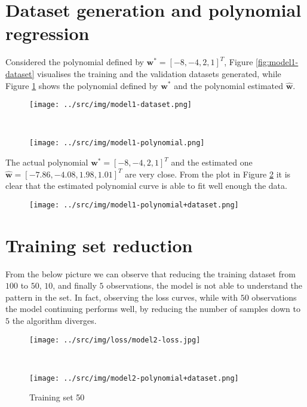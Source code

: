 \documentclass[a4paper,12pt]{article} %
\begin{document}
	\section{Dataset generation and polynomial regression} 
	Considered the polynomial defined by $\textbf{w}^*=[-8,-4,2,1]^T$, Figure 
	\ref{fig:model1-dataset} visualises the training and the validation 
	datasets generated, while Figure \ref{fig:model1-polynomial} shows 
	the polynomial defined by $\textbf{w}^*$ and the polynomial estimated 
	$\hat{\textbf{w}}$.
	
	\begin{figure}[H]
		\begin{minipage}[c]{.5\textwidth}
			\centering
			\texttt{[image: ../src/img/model1-dataset.png]}
			\label{fig:model1-dataset}
		\end{minipage}
		~
		\begin{minipage}[c]{.5\textwidth}
			\centering
			\texttt{[image: ../src/img/model1-polynomial.png]}
			\label{fig:model1-polynomial}
		\end{minipage}
	\end{figure}
	
 	The actual polynomial $\textbf{w}^*=[-8,-4,2,1]^T$ and the estimated one 	
 	$\hat{\textbf{w}}=[-7.86,-4.08,1.98,1.01]^T$ are very close.
 	From the plot in Figure \ref{fig:model1-polynomial+dataset} it is clear 
 	that the estimated polynomial curve is able to fit well enough the data.
 	
	\begin{figure}[H]
		\centering
		\texttt{[image: ../src/img/model1-polynomial+dataset.png]}
		\label{fig:model1-polynomial+dataset}
	\end{figure}
	
	\section{Training set reduction}
	From the below picture we can observe that reducing the training dataset 
	from $100$ to $50$, $10$, and finally $5$ observations, the model is not 
	able to understand the pattern in the set. In fact, observing the loss 
	curves, while with $50$ observations the model continuing performs well, by 
	reducing the number of samples down to $5$ the algorithm diverges.
	
	\begin{figure}[H]
		\begin{minipage}[t]{.5\textwidth}
			\centering
			\texttt{[image: ../src/img/loss/model2-loss.jpg]}
			\label{fig:model2-loss}
		\end{minipage}
		~
		\begin{minipage}[t]{.5\textwidth}
			\centering
			\texttt{[image: ../src/img/model2-polynomial+dataset.png]}
			\label{fig:model2-polynomial+dataset}
		\end{minipage}
	\caption{Training set 50}
	\end{figure}
	
\end{document}
